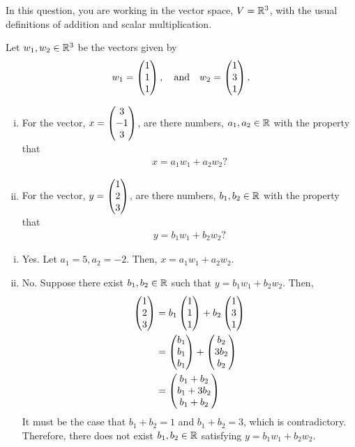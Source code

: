 \begin{question}\label{que:TowardsSpan}
	\normalfont
	
	In this question, you are working in the vector space, $V={\mathbb R}^3$, with the usual definitions of addition and scalar multiplication.  
	
	Let $w_1, w_2\in{\mathbb R}^3$ be the vectors given by 
	\[
        \begin{aligned}
            w_1 = \begin{pmatrix} 1\\ 1\\ 1\end{pmatrix},\ \ \ \text{and}\ \ \ w_2 = \begin{pmatrix} 1\\ 3\\ 1\end{pmatrix}.
        \end{aligned}
    \]
    \begin{enumerate}[(i)]
		\item For the vector, $\displaystyle x = \begin{pmatrix} 3\\ -1\\ 3\end{pmatrix}$, are there numbers, $a_1,a_2\in{\mathbb R}$ with the property that
		\[
            \begin{aligned}
			    x = a_1 w_1 + a_2 w_2?
		    \end{aligned}
		\]
		\item For the vector, $\displaystyle y = \begin{pmatrix} 1\\ 2\\ 3\end{pmatrix}$, are there numbers, $b_1,b_2\in{\mathbb R}$ with the property that
        \[
            \begin{aligned}
                y = b_1 w_1 + b_2 w_2?
            \end{aligned}
        \]
	\end{enumerate}
\end{question}
\begin{sol}
    \begin{enumerate}[(i)]
        \item Yes. Let $a_1=5, a_2=-2.$ Then, $x=a_1w_1+a_2w_2$.
        \item No. Suppose there exist $b_1,b_2\in\mathbb R$ such that $y=b_1w_1+b_2w_2$. Then, 
        \[
            \begin{aligned}
                \begin{pmatrix} 1\\ 2\\ 3\end{pmatrix} &= b_1 \begin{pmatrix} 1\\ 1\\ 1\end{pmatrix}+b_2 \begin{pmatrix} 1\\ 3\\ 1\end{pmatrix}\\
                                      &= \begin{pmatrix} b_1\\ b_1\\ b_1\end{pmatrix}+\begin{pmatrix} b_2\\ 3b_2\\ b_2\end{pmatrix}\\
                                      &= \begin{pmatrix} b_1+b_2\\ b_1+3b_2\\ b_1+b_2\end{pmatrix}
            \end{aligned}
        \]
        It must be the case that $b_1+b_2=1$ and $b_1+b_2=3$, which is contradictory. Therefore, there does not exist $b_1,b_2\in\mathbb R$ satisfying $y=b_1w_1+b_2w_2$.
    \end{enumerate}
    
\end{sol}